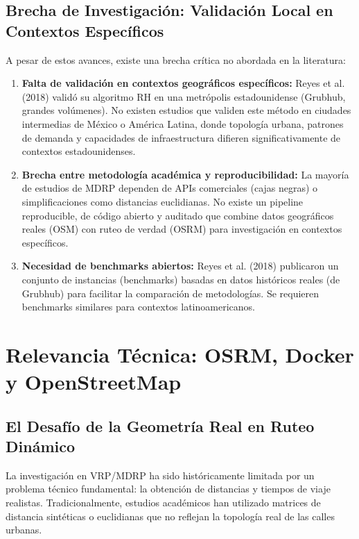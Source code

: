 \subsection{Brecha de Investigación: Validación Local en Contextos Específicos}

A pesar de estos avances, existe una brecha crítica no abordada en la 
literatura:

\begin{enumerate}
    \item \textbf{Falta de validación en contextos geográficos específicos:} 
    Reyes et al. (2018) validó su algoritmo RH en una metrópolis estadounidense 
    (Grubhub, grandes volúmenes). No existen estudios que validen este 
    método en ciudades intermedias de México o América Latina, donde topología 
    urbana, patrones de demanda y capacidades de infraestructura difieren 
    significativamente de contextos estadounidenses.
    
    \item \textbf{Brecha entre metodología académica y reproducibilidad:} 
    La mayoría de estudios de MDRP dependen de APIs comerciales (cajas negras) 
    o simplificaciones como distancias euclidianas. No existe un pipeline 
    reproducible, de código abierto y auditado que combine datos geográficos 
    reales (OSM) con ruteo de verdad (OSRM) para investigación en contextos 
    específicos.
    
    \item \textbf{Necesidad de benchmarks abiertos:} Reyes et al. (2018) 
    publicaron un conjunto de instancias (benchmarks) basadas en datos 
    históricos reales (de Grubhub) para facilitar la comparación de 
    metodologías. Se requieren benchmarks similares para contextos 
    latinoamericanos.
\end{enumerate}

\section{Relevancia Técnica: OSRM, Docker y OpenStreetMap}

\subsection{El Desafío de la Geometría Real en Ruteo Dinámico}

La investigación en VRP/MDRP ha sido históricamente limitada por un problema 
técnico fundamental: la obtención de distancias y tiempos de viaje realistas. 
Tradicionalmente, estudios académicos han utilizado matrices de distancia 
sintéticas o euclidianas que no reflejan la topología real de las calles 
urbanas.

